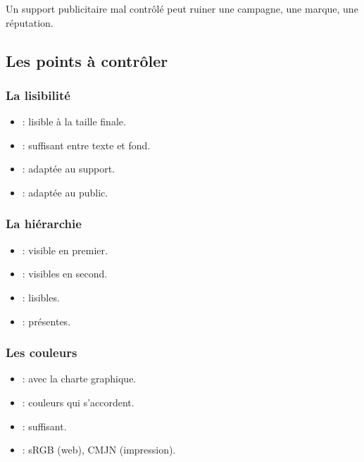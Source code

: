 Un support publicitaire mal contrôlé peut ruiner une campagne, une marque, une réputation.

\subsection{Les points à contrôler}

\subsubsection{La lisibilité}

\begin{itemize}
    \item {} : lisible à la taille finale.
    \item {} : suffisant entre texte et fond.
    \item {} : adaptée au support.
    \item {} : adaptée au public.
\end{itemize}

\subsubsection{La hiérarchie}

\begin{itemize}
    \item {} : visible en premier.
    \item {} : visibles en second.
    \item {} : lisibles.
    \item {} : présentes.
\end{itemize}

\subsubsection{Les couleurs}

\begin{itemize}
    \item {} : avec la charte graphique.
    \item {} : couleurs qui s'accordent.
    \item {} : suffisant.
    \item {} : sRGB (web), CMJN (impression).
\end{itemize}

